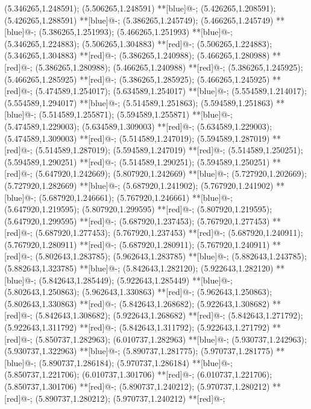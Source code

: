 (5.346265,1.248591); (5.506265,1.248591) **[blue]@{-};
(5.426265,1.208591); (5.426265,1.288591) **[blue]@{-};
(5.386265,1.245749); (5.466265,1.245749) **[blue]@{-};
(5.386265,1.251993); (5.466265,1.251993) **[blue]@{-};
(5.346265,1.224883); (5.506265,1.304883) **[red]@{-};
(5.506265,1.224883); (5.346265,1.304883) **[red]@{-};
(5.386265,1.240988); (5.466265,1.280988) **[red]@{-};
(5.386265,1.280988); (5.466265,1.240988) **[red]@{-};
(5.386265,1.245925); (5.466265,1.285925) **[red]@{-};
(5.386265,1.285925); (5.466265,1.245925) **[red]@{-};
(5.474589,1.254017); (5.634589,1.254017) **[blue]@{-};
(5.554589,1.214017); (5.554589,1.294017) **[blue]@{-};
(5.514589,1.251863); (5.594589,1.251863) **[blue]@{-};
(5.514589,1.255871); (5.594589,1.255871) **[blue]@{-};
(5.474589,1.229003); (5.634589,1.309003) **[red]@{-};
(5.634589,1.229003); (5.474589,1.309003) **[red]@{-};
(5.514589,1.247019); (5.594589,1.287019) **[red]@{-};
(5.514589,1.287019); (5.594589,1.247019) **[red]@{-};
(5.514589,1.250251); (5.594589,1.290251) **[red]@{-};
(5.514589,1.290251); (5.594589,1.250251) **[red]@{-};
(5.647920,1.242669); (5.807920,1.242669) **[blue]@{-};
(5.727920,1.202669); (5.727920,1.282669) **[blue]@{-};
(5.687920,1.241902); (5.767920,1.241902) **[blue]@{-};
(5.687920,1.246661); (5.767920,1.246661) **[blue]@{-};
(5.647920,1.219595); (5.807920,1.299595) **[red]@{-};
(5.807920,1.219595); (5.647920,1.299595) **[red]@{-};
(5.687920,1.237453); (5.767920,1.277453) **[red]@{-};
(5.687920,1.277453); (5.767920,1.237453) **[red]@{-};
(5.687920,1.240911); (5.767920,1.280911) **[red]@{-};
(5.687920,1.280911); (5.767920,1.240911) **[red]@{-};
(5.802643,1.283785); (5.962643,1.283785) **[blue]@{-};
(5.882643,1.243785); (5.882643,1.323785) **[blue]@{-};
(5.842643,1.282120); (5.922643,1.282120) **[blue]@{-};
(5.842643,1.285449); (5.922643,1.285449) **[blue]@{-};
(5.802643,1.250863); (5.962643,1.330863) **[red]@{-};
(5.962643,1.250863); (5.802643,1.330863) **[red]@{-};
(5.842643,1.268682); (5.922643,1.308682) **[red]@{-};
(5.842643,1.308682); (5.922643,1.268682) **[red]@{-};
(5.842643,1.271792); (5.922643,1.311792) **[red]@{-};
(5.842643,1.311792); (5.922643,1.271792) **[red]@{-};
(5.850737,1.282963); (6.010737,1.282963) **[blue]@{-};
(5.930737,1.242963); (5.930737,1.322963) **[blue]@{-};
(5.890737,1.281775); (5.970737,1.281775) **[blue]@{-};
(5.890737,1.286184); (5.970737,1.286184) **[blue]@{-};
(5.850737,1.221706); (6.010737,1.301706) **[red]@{-};
(6.010737,1.221706); (5.850737,1.301706) **[red]@{-};
(5.890737,1.240212); (5.970737,1.280212) **[red]@{-};
(5.890737,1.280212); (5.970737,1.240212) **[red]@{-};
